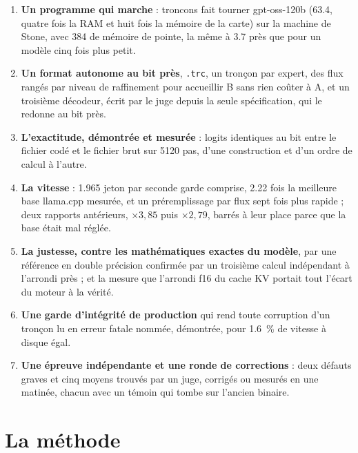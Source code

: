 \begin{enumerate}
\item \textbf{Un programme qui marche} : troncons fait tourner gpt-oss-120b (\SI{63.4}{\Go}, quatre fois la RAM et huit fois la mémoire de la carte) sur la machine de Stone, avec \SI{384}{\Mo} de mémoire de pointe, la même à \SI{3.7}{\Mo} près que pour un modèle cinq fois plus petit.
\item \textbf{Un format autonome au bit près}, \texttt{.trc}, un tronçon par expert, des flux rangés par niveau de raffinement pour accueillir B sans rien coûter à A, et un troisième décodeur, écrit par le juge depuis la seule spécification, qui le redonne au bit près.
\item \textbf{L'exactitude, démontrée et mesurée} : logits identiques au bit entre le fichier codé et le fichier brut sur \num{5120} pas, d'une construction et d'un ordre de calcul à l'autre.
\item \textbf{La vitesse} : \num{1.965} jeton par seconde garde comprise, \num{2.22} fois la meilleure base llama.cpp mesurée, et un préremplissage par flux sept fois plus rapide ; deux rapports antérieurs, $\times 3{,}85$ puis $\times 2{,}79$, barrés à leur place parce que la base était mal réglée.
\item \textbf{La justesse, contre les mathématiques exactes du modèle}, par une référence en double précision confirmée par un troisième calcul indépendant à l'arrondi près ; et la mesure que l'arrondi f16 du cache KV portait tout l'écart du moteur à la vérité.
\item \textbf{Une garde d'intégrité de production} qui rend toute corruption d'un tronçon lu en erreur fatale nommée, démontrée, pour \SI{1.6}{\percent} de vitesse à disque égal.
\item \textbf{Une épreuve indépendante et une ronde de corrections} : deux défauts graves et cinq moyens trouvés par un juge, corrigés ou mesurés en une matinée, chacun avec un témoin qui tombe sur l'ancien binaire.
\end{enumerate}

\section{La méthode}\label{t2i-sec:methode}

